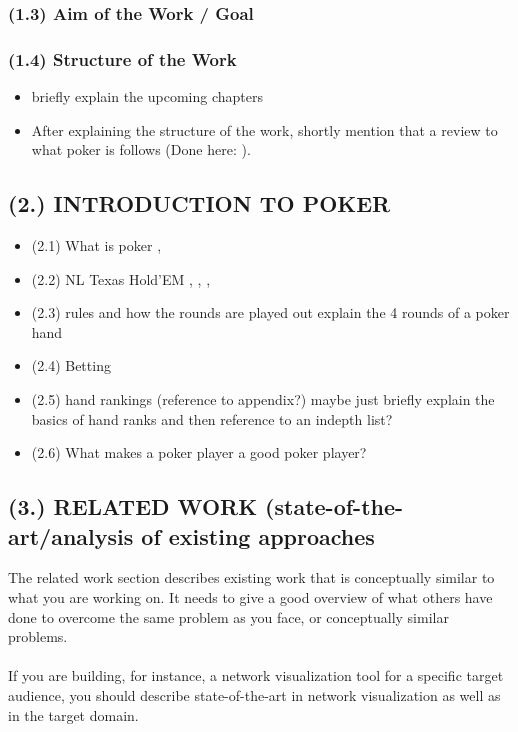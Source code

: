\subsubsection{(1.3) Aim of the Work / Goal}
\subsubsection{(1.4) Structure of the Work}
\begin{itemize}
\item briefly explain the upcoming chapters
\item After explaining the structure of the work, shortly mention that a review to what poker is follows (Done here: \cite{review}).
\end{itemize}
\pagebreak
\subsection{(2.) INTRODUCTION TO POKER}
\begin{itemize}
\item (2.1) What is poker
\subitem \cite{master_nuno}, \cite{review}
\item (2.2) NL Texas Hold'EM
\subitem \cite{master_nuno}, \cite{pena},  \cite{strong_poker}, \cite{review}
\item (2.3) rules and how the rounds are played out
\subitem \cite{master_nuno}
\subitem explain the 4 rounds of a poker hand
\item (2.4) Betting
\subitem \cite{master_nuno}
\item (2.5) hand rankings (reference to appendix?) 
\subitem \cite{master_nuno}
\subitem maybe just briefly explain the basics of hand ranks and then reference to an indepth list?
\item (2.6) What makes a poker player a good poker player?
\subitem {} \cite{strong_poker }
\subitem \cite{master_nuno}
\end{itemize}
\pagebreak
\subsection{(3.) RELATED WORK (state-of-the-art/analysis of existing approaches}
The related work section describes existing work that is conceptually similar to what you are working on. It needs to give a good overview of what others have done to overcome the same problem as you face, or conceptually similar problems.\\\\
If you are building, for instance, a network visualization tool for a specific target audience, you should describe state-of-the-art in
network visualization as well as in the target domain.\\\\
\pagebreak
